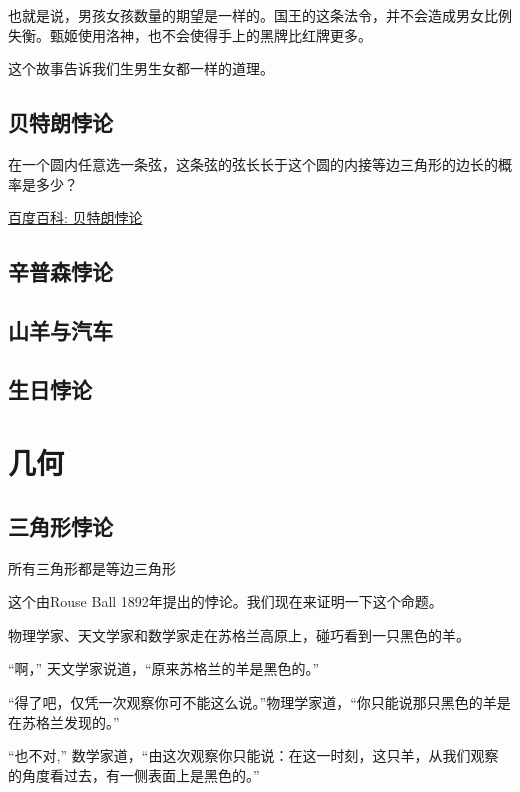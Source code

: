 \documentclass[12pt, letterpaper]{ctexrep}
\newenvironment{shadedquotation}
 {\begin{shaded*}
  \quoting[leftmargin=5pt, rightmargin=5pt, vskip=0pt]
 }
 {\endquoting
 \end{shaded*}
}
\begin{document}
也就是说，男孩女孩数量的期望是一样的。国王的这条法令，并不会造成男女比例失衡。甄姬使用洛神，也不会使得手上的黑牌比红牌更多。

这个故事告诉我们生男生女都一样的道理。


\section{贝特朗悖论}
在一个圆内任意选一条弦，这条弦的弦长长于这个圆的内接等边三角形的边长的概率是多少？

\href{https://baike.baidu.com/item/\%E8\%B4\%9D\%E7\%89\%B9\%E6\%9C\%97\%E6\%82\%96\%E8\%AE\%BA}{百度百科: 贝特朗悖论}


\section{辛普森悖论}


\section{山羊与汽车}


\section{生日悖论}




\chapter{几何}


\section{三角形悖论}
\begin{shadedquotation}
\noindent
所有三角形都是等边三角形
\end{shadedquotation}


这个由Rouse Ball 1892年提出的悖论。我们现在来证明一下这个命题。

\begin{center}

\end{center}

\begin{shadedquotation}
\noindent
物理学家、天文学家和数学家走在苏格兰高原上，碰巧看到一只黑色的羊。
\noindent

\noindent
“啊，” 天文学家说道，“原来苏格兰的羊是黑色的。”
\noindent

\noindent
“得了吧，仅凭一次观察你可不能这么说。”物理学家道，“你只能说那只黑色的羊是在苏格兰发现的。”
\noindent

\noindent
“也不对,” 数学家道，“由这次观察你只能说：在这一时刻，这只羊，从我们观察的角度看过去，有一侧表面上是黑色的。”
\end{shadedquotation}
\end{document}
